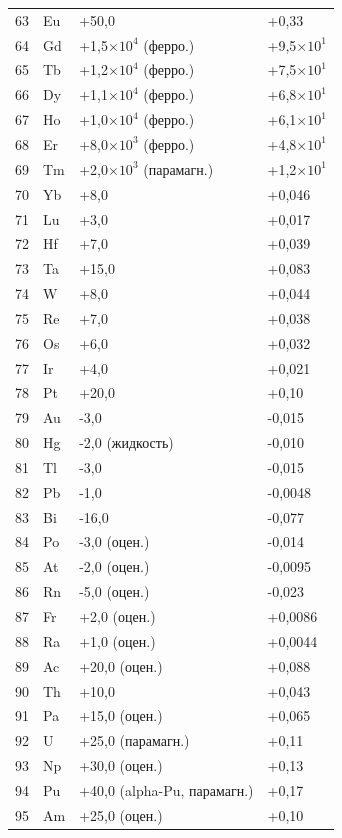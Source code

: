 \documentclass[12pt,a4paper]{article}
\begin{document}
\begin{longtable}{p{0.6cm}p{1.2cm}p{2.5cm}p{2.5cm}}
		63 & Eu & +50,0 & +0,33 \\
		64 & Gd & +1,5\(\times10^4\) (ферро.) & +9,5\(\times10^1\) \\
		65 & Tb & +1,2\(\times10^4\) (ферро.) & +7,5\(\times10^1\) \\
		66 & Dy & +1,1\(\times10^4\) (ферро.) & +6,8\(\times10^1\) \\
		67 & Ho & +1,0\(\times10^4\) (ферро.) & +6,1\(\times10^1\) \\
		68 & Er & +8,0\(\times10^3\) (ферро.) & +4,8\(\times10^1\) \\
		69 & Tm & +2,0\(\times10^3\) (парамагн.) & +1,2\(\times10^1\) \\
		70 & Yb & +8,0 & +0,046 \\
		71 & Lu & +3,0 & +0,017 \\
		72 & Hf & +7,0 & +0,039 \\
		73 & Ta & +15,0 & +0,083 \\
		74 & W  & +8,0 & +0,044 \\
		75 & Re & +7,0 & +0,038 \\
		76 & Os & +6,0 & +0,032 \\
		77 & Ir & +4,0 & +0,021 \\
		78 & Pt & +20,0 & +0,10 \\
		79 & Au & -3,0 & -0,015 \\
		80 & Hg & -2,0 (жидкость) & -0,010 \\
		81 & Tl & -3,0 & -0,015 \\
		82 & Pb & -1,0 & -0,0048 \\
		83 & Bi & -16,0 & -0,077 \\
		84 & Po & -3,0 (оцен.) & -0,014 \\
		85 & At & -2,0 (оцен.) & -0,0095 \\
		86 & Rn & -5,0 (оцен.) & -0,023 \\
		87 & Fr & +2,0 (оцен.) & +0,0086 \\
		88 & Ra & +1,0 (оцен.) & +0,0044 \\
		89 & Ac & +20,0 (оцен.) & +0,088 \\
		90 & Th & +10,0 & +0,043 \\
		91 & Pa & +15,0 (оцен.) & +0,065 \\
		92 & U  & +25,0 (парамагн.) & +0,11 \\
		93 & Np & +30,0 (оцен.) & +0,13 \\
		94 & Pu & +40,0 (alpha-Pu, парамагн.) & +0,17 \\
		95 & Am & +25,0 (оцен.) & +0,10 \\

\end{longtable}
\end{document}
